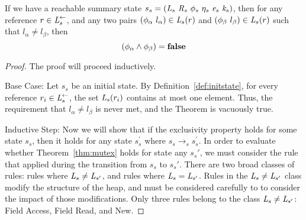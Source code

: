 \begin{theorem}
\label{thm:mutex}
If we have a reachable summary state $s_s = ( \cfgnt{L}_s\ \cfgnt{R}_s\ \phi_s\ \eta_s\ \cfgnt{e}_s\ \cfgnt{k}_s )$, then for any reference $r \in \emph{L}_s^\leftarrow$, and any two pairs $(\phi_\alpha\ l_\alpha) \in \emph{L}_s(r)$ and $(\phi_\beta\ l_\beta) \in \emph{L}_s(r)$ such that $l_\alpha \ne l_\beta$, then
$$(\phi_\alpha \wedge \phi_\beta) = \textbf{false}$$
\end{theorem}
\begin{proof}
The proof will proceed inductively. 

Base Case: Let $s_s$ be an initial state. By Definition~\ref{def:initstate}, for every reference $r_i \in \emph{L}_s^\leftarrow$, the set $\emph{L}_s(r_i)$ contains at most one element. Thus, the requirement that $l_\alpha \ne l_\beta$ is never met, and the Theorem is vacuously true.

Inductive Step: Now we will show that if the exclusivity property holds for some state $s_s$, then it holds for any state $s_s^\prime$ where $s_s \rightarrow_s s_s^\prime$. In order to evaluate whether Theorem~\ref{thm:mutex} holds for state any $s_s\prime$, we must consider the rule that applied during the transition from $s_s$ to $s_s\prime$. There are two broad classes of rules: rules where $ \emph{L}_s \neq  \emph{L}_{s^\prime}$, and rules where $ \emph{L}_s =  \emph{L}_{s^\prime}$. Rules in the $ \emph{L}_s \neq  \emph{L}_{s^\prime}$ class modify the structure of the heap, and must be considered carefully to to consider the impact of those modifications. Only three rules belong to the class $ \emph{L}_s \neq  \emph{L}_{s^\prime}$: Field Access, Field Read, and New. 


\end{proof}
